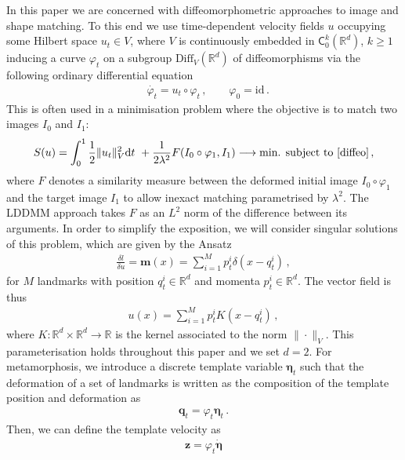 \documentclass[runningheads]{llncs}
\newcommand{\half}{\frac 12}
\newcommand{\norm}[2]{\| #1 \|_{ #2 }}
\newcommand{\vnorm}[1]{\norm{ #1 }{V}}
\newcommand{\diff}[1]{\text{d} #1}
\newcommand{\Rd}{\mathbb{R}^{d}}
\begin{document}
In this paper we are concerned with diffeomorphometric approaches to image and
shape matching. To this end we use time-dependent velocity fields $u$ occupying
some Hilbert space $u_t \in V$, where $V$ is continuously embedded in
$\textsf{C}_0^k(\Rd)$, $k\geq 1$ inducing a curve $\varphi_t$ on a subgroup
$\text{Diff}_V(\Rd)$ of diffeomorphisms
\cite{arnold1966geometrie,younes2010shapes} via the following ordinary
differential equation
\begin{align}
& \dot{\varphi_t} = u_t \circ \varphi_t\, , \qquad  \varphi_0 = \text{id}\, . 
  \label{diffeo}
\end{align}
This is often used in a minimisation problem where the objective is to match two
images $I_0$ and $I_1$:
\begin{align}
  S(u) = \int_0^1 \half\vnorm{u_t}^2 \diff{t} + \frac{1}{2\lambda^2}
  F(I_0\circ\varphi_1, I_1)\longrightarrow \text{min. subject to \eqref{diffeo}}\, , \label{E-def}
\end{align}
where $F$ denotes a similarity measure between the deformed initial image
$I_0\circ \varphi_1$ and the target image $I_1$ to allow inexact matching
parametrised by $\lambda^2$. The LDDMM approach takes $F$ as an $L^2$ norm of
the difference between its arguments. In order to simplify the exposition, we
will consider singular solutions of this problem, which are given by the Ansatz
\begin{align}
  \frac{\delta l}{\delta u} = \mathbf m(x) = \sum_{i=1}^M p_t^i \delta(x-q_t^i)\,, 
\end{align}
for $M$ landmarks with position $q_t^i\in \Rd$ and momenta $p_t^i \in \Rd$.
The vector field is thus 
\begin{align}
  u(x) = \sum_{i=1}^M p_t^i K(x-q_t^i)\,, 
  \label{u-def}
\end{align}
where $K:\mathbb R^d\times \mathbb R^d\to \mathbb R$ is the kernel associated to
the norm $\|\cdot \|_V$. This parameterisation holds throughout this paper and
we set $d=2$. For metamorphosis, we introduce a discrete template variable
$\boldsymbol \eta_t$ such that the deformation of a set of landmarks is written
as the composition of the template position and deformation as
\begin{align}
  \mathbf q_t = \varphi_t \boldsymbol \eta_t\, . 
  \label{q_t}
\end{align}
Then, we can define the template velocity as 
\begin{align}
  \mathbf z = \varphi_t \dot {\boldsymbol \eta}
  \label{z_eta}
\end{align}
\end{document}
